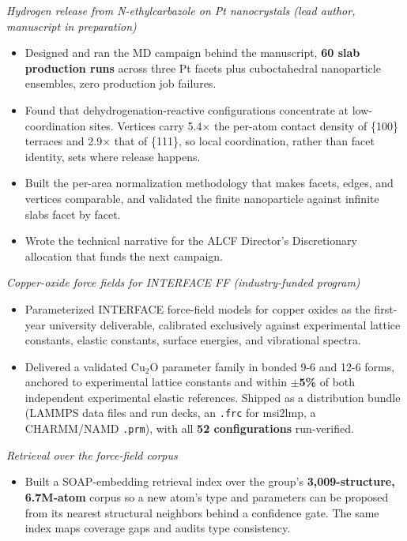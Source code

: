 \documentclass[letterpaper,10pt]{article}
\newcommand{\keep}{\needspace{4\baselineskip}}
\begin{document}
\keep\textit{Hydrogen release from N-ethylcarbazole on Pt nanocrystals (lead author, manuscript in preparation)}
\begin{itemize}
    \item Designed and ran the MD campaign behind the manuscript, \textbf{60 slab production runs} across three Pt facets plus cuboctahedral nanoparticle ensembles, zero production job failures.
    \item Found that dehydrogenation-reactive configurations concentrate at low-coordination sites. Vertices carry 5.4\(\times\) the per-atom contact density of \{100\} terraces and 2.9\(\times\) that of \{111\}, so local coordination, rather than facet identity, sets where release happens.
    \item Built the per-area normalization methodology that makes facets, edges, and vertices comparable, and validated the finite nanoparticle against infinite slabs facet by facet.
    \item Wrote the technical narrative for the ALCF Director's Discretionary allocation that funds the next campaign.
\end{itemize}

\keep\textit{Copper-oxide force fields for INTERFACE FF (industry-funded program)}
\begin{itemize}
    \item Parameterized INTERFACE force-field models for copper oxides as the first-year university deliverable, calibrated exclusively against experimental lattice constants, elastic constants, surface energies, and vibrational spectra.
    \item Delivered a validated Cu\(_2\)O parameter family in bonded 9-6 and 12-6 forms, anchored to experimental lattice constants and within \textbf{\(\pm\)5\%} of both independent experimental elastic references. Shipped as a distribution bundle (LAMMPS data files and run decks, an \texttt{.frc} for msi2lmp, a CHARMM/NAMD \texttt{.prm}), with all \textbf{52 configurations} run-verified.
\end{itemize}

\keep\textit{Retrieval over the force-field corpus}
\begin{itemize}
    \item Built a SOAP-embedding retrieval index over the group's \textbf{3,009-structure, 6.7M-atom} corpus so a new atom's type and parameters can be proposed from its nearest structural neighbors behind a confidence gate. The same index maps coverage gaps and audits type consistency.
\end{itemize}
\end{document}
